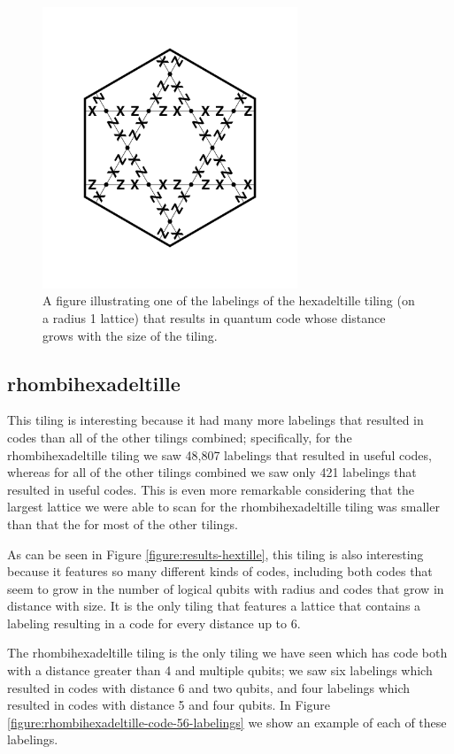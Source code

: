 \documentclass{amsbook}
\theoremstyle{plain}
\theoremstyle{definition}
\theoremstyle{remark}
\begin{document}
\begin{figure}
\includegraphics[width=3in]{images/hexadeltille-code-labeling}
\caption{
\label{figure:hexadeltille-code-labeling}
A figure illustrating one of the labelings of the hexadeltille tiling (on a radius 1 lattice) that results in quantum code whose distance grows with the size of the tiling.
}
\end{figure}
\subsection{rhombihexadeltille}

This tiling is interesting because it had many more labelings that resulted in codes  than all of the other tilings combined;  specifically, for the rhombihexadeltille tiling we saw 48,807 labelings that resulted in useful codes, whereas for all of the other tilings combined we saw only 421 labelings that resulted in useful codes.  This is even more remarkable considering that the largest lattice we were able to scan for the rhombihexadeltille tiling was smaller than that the for most of the other tilings.

As can be seen in Figure \ref{figure:results-hextille}, this tiling is also interesting because it features so many different kinds of codes, including both codes that seem to grow in the number of logical qubits with radius and codes that grow in distance with size.  It is the only tiling that features a lattice that contains a labeling resulting in a code for every distance up to 6.

The rhombihexadeltille tiling is the only tiling we have seen which has code both with a distance greater than 4 and multiple qubits;  we saw six labelings which resulted in codes with distance 6 and two qubits, and four labelings which resulted in codes with distance 5 and four qubits.  In Figure \ref{figure:rhombihexadeltille-code-56-labelings} we show an example of each of these labelings.
\end{document}
